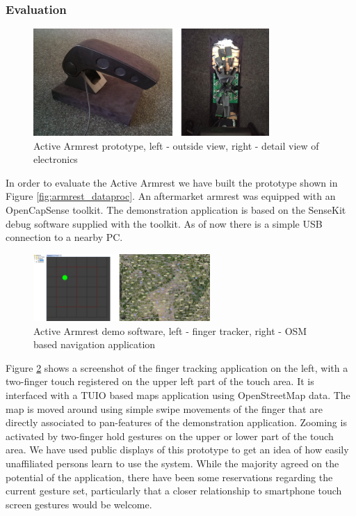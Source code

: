 \subsubsection{Evaluation}
\begin{figure}[h]
\centering
\includegraphics[width=0.8\textwidth]{images/armrest_proto}
\caption{Active Armrest prototype, left - outside view, right - detail view of electronics}
\label{fig:armrest_proto}
\end{figure}
In order to evaluate the Active Armrest we have built the prototype shown in Figure \ref{fig:armrest_dataproc}. An aftermarket armrest was equipped with an OpenCapSense toolkit. The demonstration application is based on the SenseKit debug software supplied with the toolkit. As of now there is a simple USB connection to a nearby PC.
\begin{figure}[h]
\centering
\includegraphics[width=0.6\textwidth]{images/armrest_eval}
\caption{Active Armrest demo software, left - finger tracker, right - OSM based navigation application}
\label{fig:armrest_eval}
\end{figure}
Figure \ref{fig:armrest_eval} shows a screenshot of the finger tracking application on the left, with a two-finger touch registered on the upper left part of the touch area. It is interfaced with a TUIO \cite{kaltenbrunner2005tuio} based maps application using OpenStreetMap \cite{haklay2008openstreetmap} data. The map is moved around using simple swipe movements of the finger that are directly associated to pan-features of the demonstration application. Zooming is activated by two-finger hold gestures on the upper or lower part of the touch area. We have used public displays of this prototype to get an idea of how easily unaffiliated persons learn to use the system. While the majority agreed on the potential of the application, there have been some reservations regarding the current gesture set, particularly that a closer relationship to smartphone touch screen gestures would be welcome.

